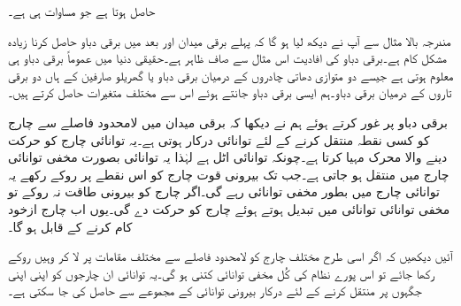 حاصل ہوتا ہے جو مساوات  ہی ہے۔

مندرجہ بالا مثال سے آپ نے دیکھ لیا ہو گا کہ پہلے برقی میدان اور بعد میں برقی دباو حاصل کرنا زیادہ مشکل کام ہے۔برقی دباو کی افادیت  اس مثال سے صاف ظاہر ہے۔حقیقی دنیا میں عموماً برقی دباو ہی  معلوم ہوتی ہے جیسے دو متوازی دھاتی چادروں کے درمیان برقی دباو یا گھریلو صارفین کے ہاں دو برقی تاروں کے درمیان برقی دباو۔ہم ایسی برقی دباو جانتے ہوئے اس سے مختلف متغیرات حاصل کرتے ہیں۔ 

برقی دباو پر غور کرتے ہوئے ہم نے دیکھا کہ برقی میدان میں لامحدود فاصلے سے چارج کو کسی نقطہ منتقل کرنے کے لئے توانائی درکار ہوتی ہے۔یہ توانائی چارج کو حرکت دینے والا محرک مہیا کرتا ہے۔چونکہ توانائی اٹل ہے لہٰذا یہ توانائی بصورت مخفی توانائی چارج میں منتقل ہو جاتی ہے۔جب تک بیرونی قوت چارج کو اس نقطے پر روکے رکھے یہ توانائی چارج میں بطور مخفی توانائی رہے گی۔اگر چارج کو بیرونی طاقت نہ روکے تو مخفی توانائی  توانائی میں تبدیل ہوتے ہوئے چارج کو حرکت دے گی۔یوں اب چارج ازخود کام کرنے کے قابل ہو گا۔

آئیں دیکھیں کہ اگر اسی طرح مختلف چارج کو لامحدود فاصلے سے مختلف مقامات پر لا کر وہیں روکے رکھا جائے تو اس پورے نظام کی کُل مخفی توانائی کتنی ہو گی۔یہ توانائی ان چارجوں کو اپنی اپنی  جگہوں پر منتقل کرنے کے لئے درکار بیرونی توانائی کے مجموعے سے حاصل کی جا سکتی ہے۔

